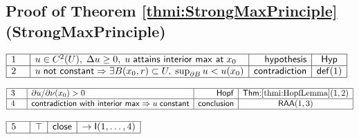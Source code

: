 \documentclass[11pt,reqno]{amsart}
\begin{document}
	\subsection*{Proof of Theorem \protect\ref{thmi:StrongMaxPrinciple} (\textsf{StrongMaxPrinciple})}
	\noindent$\begin{array}{|m{0.5cm}|l|r|c|}
	\hline
	1 & u\in C^{2}(U),\;\Delta u\ge0,\;u\;\mathsf{attains\ interior\ max\ at}\;x_{0} & \mathsf{hypothesis} & \mathsf{Hyp} \\ \hline
	2 & u\;\mathsf{not\ constant}\Rightarrow\exists B(x_{0},r)\subset U,\;\sup_{\partial B}u<u(x_{0}) & \mathsf{contradiction} & \mathsf{def}(1) \\ \hline
	\end{array}$
	\par\nointerlineskip\noindent$\begin{array}{|m{0.5cm}|l|r|c|}
	\hline
	3 & \partial u/\partial\nu(x_{0})>0 & \mathsf{Hopf} & \textsf{Thm:}\ref{thmi:HopfLemma}(1,2) \\ \hline
	4 & \mathsf{contradiction\ with\ interior\ max}\Rightarrow u\;\mathsf{constant} & \mathsf{conclusion} & \mathsf{RAA}(1,3) \\ \hline
	\end{array}$
	\par\nointerlineskip\noindent$\begin{array}{|m{0.5cm}|l|r|c|}
	\hline
	5 & \top & \mathsf{close} & \to\mathsf{I}(1,\dots,4) \\ \hline
	\end{array}$
	\medskip
	
\end{document}
